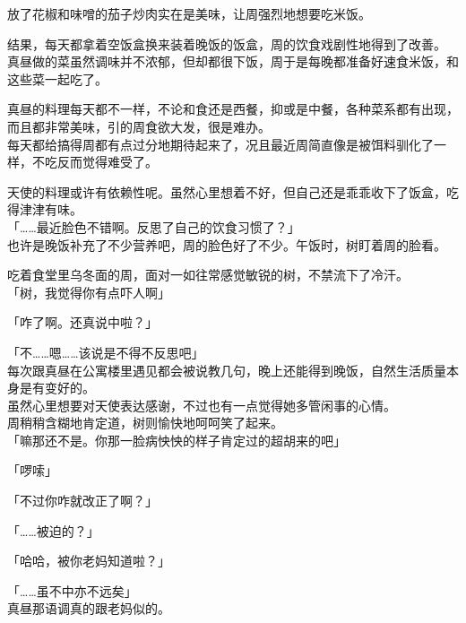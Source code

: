 放了花椒和味噌的茄子炒肉实在是美味，让周强烈地想要吃米饭。\\

\vspace{2\baselineskip}

结果，每天都拿着空饭盒换来装着晚饭的饭盒，周的饮食戏剧性地得到了改善。\\

真昼做的菜虽然调味并不浓郁，但却都很下饭，周于是每晚都准备好速食米饭，和这些菜一起吃了。

真昼的料理每天都不一样，不论和食还是西餐，抑或是中餐，各种菜系都有出现，而且都非常美味，引的周食欲大发，很是难办。\\

每天都给搞得周都有点过分地期待起来了，况且最近周简直像是被饵料驯化了一样，不吃反而觉得难受了。

天使的料理或许有依赖性呢。虽然心里想着不好，但自己还是乖乖收下了饭盒，吃得津津有味。\\

「……最近脸色不错啊。反思了自己的饮食习惯了？」\\

也许是晚饭补充了不少营养吧，周的脸色好了不少。午饭时，树盯着周的脸看。

吃着食堂里乌冬面的周，面对一如往常感觉敏锐的树，不禁流下了冷汗。\\

「树，我觉得你有点吓人啊」

「咋了啊。还真说中啦？」

「不……嗯……该说是不得不反思吧」\\

每次跟真昼在公寓楼里遇见都会被说教几句，晚上还能得到晚饭，自然生活质量本身是有变好的。\\

虽然心里想要对天使表达感谢，不过也有一点觉得她多管闲事的心情。\\

周稍稍含糊地肯定道，树则愉快地呵呵笑了起来。\\

「嘛那还不是。你那一脸病怏怏的样子肯定过的超胡来的吧」

「啰嗦」

「不过你咋就改正了啊？」

「……被迫的？」

「哈哈，被你老妈知道啦？」

「……虽不中亦不远矣」\\

真昼那语调真的跟老妈似的。

